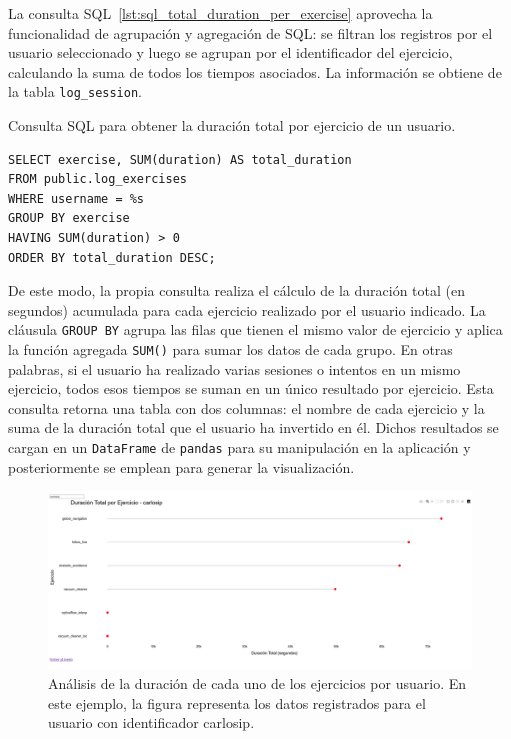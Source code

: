 \documentclass[a4paper, 12pt]{book}
\begin{document}
La consulta SQL~\ref{lst:sql_total_duration_per_exercise} aprovecha la funcionalidad de agrupación y agregación de SQL: se filtran los registros por el usuario seleccionado y luego se agrupan por el identificador del ejercicio, calculando la suma de todos los tiempos asociados. La información se obtiene de la tabla \texttt{log\_session}.

\begin{listing}[h!]
\caption{Consulta SQL para obtener la duración total por ejercicio de un usuario.}
\label{lst:sql_total_duration_per_exercise}
\begin{verbatim}
SELECT exercise, SUM(duration) AS total_duration
FROM public.log_exercises
WHERE username = %s
GROUP BY exercise
HAVING SUM(duration) > 0
ORDER BY total_duration DESC;
\end{verbatim}
\end{listing}

De este modo, la propia consulta realiza el cálculo de la duración total (en segundos) acumulada para cada ejercicio realizado por el usuario indicado. La cláusula \texttt{GROUP BY} agrupa las filas que tienen el mismo valor de ejercicio y aplica la función agregada \texttt{SUM()} para sumar los datos de cada grupo. En otras palabras, si el usuario ha realizado varias sesiones o intentos en un mismo ejercicio, todos esos tiempos se suman en un único resultado por ejercicio. Esta consulta retorna una tabla con dos columnas: el nombre de cada ejercicio y la suma de la duración total que el usuario ha invertido en él. Dichos resultados se cargan en un \texttt{DataFrame} de \texttt{pandas} para su manipulación en la aplicación y posteriormente se emplean para generar la visualización.

\begin{figure}[H]
  \centering
  \includegraphics[width=1.1\textwidth]{img/1a.png}
  \caption{Análisis de la duración de cada uno de los ejercicios por usuario. En este ejemplo, la figura representa los datos registrados para el usuario con identificador carlosip.}
  \label{fig:1a}
\end{figure}
\end{document}
